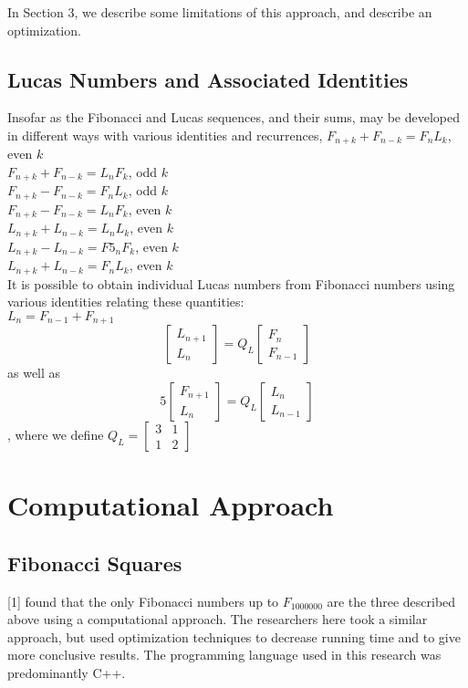 \documentclass[11pt]{article}
\begin{document}
In Section 3, we describe some limitations of this approach, and describe an optimization.

\subsection{Lucas Numbers and Associated Identities}
Insofar as the Fibonacci and Lucas sequences, and their sums, may be developed in different ways with various identities and recurrences, 
$F_{n+k} + F_{n-k} = F_{n}L_{k}$, even $k$\\
$F_{n+k} + F_{n-k} = L_{n}F_{k}$, odd $k$\\$F_{n+k} - F_{n-k} = F_{n}L_{k}$, odd $k$ \\ $F_{n+k} - F_{n-k} = L_{n}F_{k}$, even $k$ \\ $L_{n+k} + L_{n-k} = L_{n}L_{k}$, even $k$ \\ $L_{n+k} - L_{n-k}= F5_{n}F_{k}$, even $k$ \\ $L_{n+k} + L_{n-k} = F_{n}L_{k}$, even $k$\\ It is possible to obtain individual Lucas numbers from Fibonacci numbers using various identities relating these quantities:\\$L_{n} = F_{n-1} + F_{n+1}$ \\ 
\[
\begin{bmatrix}
L_{n+1} \\
L_{n}
\end{bmatrix} = Q_{L} \begin{bmatrix} F_{n} \\ F_{n-1}\end{bmatrix}
\] 
as well as \\
\[
5\begin{bmatrix}
F_{n+1} \\
L_{n}
\end{bmatrix} = Q_{L} \begin{bmatrix} L_{n} \\ L_{n-1}\end{bmatrix}
\] , where we define $Q_{L} = \begin{bmatrix} 3 & 1 \\ 1 & 2 \end{bmatrix}$

\section{Computational Approach}
\subsection{Fibonacci Squares}
[1] found that the only Fibonacci numbers up to $F_{1000000}$ are the three described above using a computational approach. The researchers here took a similar approach, but used optimization techniques to decrease running time and to give more conclusive results. The programming language used in this research was predominantly C++.
\end{document}
